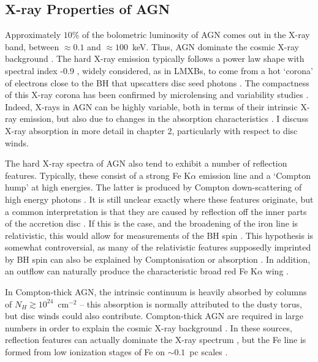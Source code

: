\subsection{X-ray Properties of AGN}

Approximately $10\%$ of the bolometric luminosity of AGN
comes out in the X-ray band, between $\approx0.1$ and $\approx100$~keV.
Thus, AGN dominate the cosmic X-ray background \citep{madau1994}.
The hard X-ray emission typically follows a power law shape with spectral
index -0.9 \citep[e.g.][]{koratkar1999}, 
widely considered, as in LMXBs, to come from a hot `corona' of 
electrons close to the BH that upscatters disc seed photons 
\citep[e.g.][]{haardt1991}. The compactness of this X-ray corona
has been confirmed by microlensing \citep{chartas2009, dai2010} 
and variability studies \citep{green1993,crenshaw1996,risaliti2007,emmanoulopoulos2014}. 
Indeed, X-rays in AGN can be highly variable, both in terms of their intrinsic 
X-ray emission, but also due to changes in the absorption characteristics 
\citep{risaliti2002,miller2008,connolly2014}.
I discuss X-ray absorption in more detail in chapter 2, particularly with respect to disc winds.

The hard X-ray spectra of AGN also tend to exhibit a number of reflection features. 
Typically, these consist of a strong Fe K$\alpha$ emission line and a `Compton hump'
at high energies. The latter is produced by Compton down-scattering 
of high energy photons \citep{pounds1989,nandra1994}.
It is still unclear exactly where these features originate, 
but a common interpretation is that they are caused by 
reflection off the inner parts of the accretion disc 
\citep{fabian1995,iwasawa1996b,reynolds1999}.
If this is the case, and the broadening of the iron line is relativistic,
this would allow for measurements of the BH spin 
\citep{laor1991,iwasawa1996a,dabrowski1997}.
This hypothesis is somewhat controversial, as 
many of the relativistic features supposedly imprinted by BH spin can also be explained
by Comptonisation or absorption \citep[e.g.][]{misra1998,miller2013}.
In addition, an outflow can naturally produce the characteristic 
broad red Fe K$\alpha$ wing \citep{sim2010}.

In Compton-thick AGN, the intrinsic continuum is heavily absorbed by columns of
$N_H\gtrsim10^{24}$~cm$^{-2}$ -- this absorption is normally attributed to the 
dusty torus, 
but disc winds could also contribute. Compton-thick AGN are required 
in large numbers in order to explain the cosmic X-ray background \citep{setti1989}.
In these sources, reflection features can actually dominate the X-ray spectrum 
\citep{alexander2011,gandhi2013}, but the Fe line is formed from low ionization
stages of Fe on $\sim0.1$~pc scales \citep{gandhi2015}.


